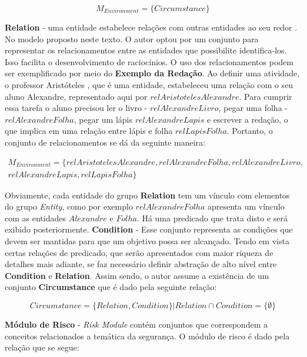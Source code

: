 \begin{equation}
    M_{Environment} = \{  Circumstance  \}
\end{equation}

\textbf{Relation} - uma entidade estabelece relações com outras entidades ao seu redor \cite{entity}. No modelo proposto neste texto. O autor optou por um conjunto para representar os relacionamentos entre as entidades que possibilite identifica-los. Isso facilita o desenvolvimento de raciocínios. O uso 
dos relacionamentos podem ser exemplificado por meio do \textbf{Exemplo da Redação}. Ao definir uma atividade, o professor Aristóteles
, que é uma entidade, estabeleceu uma relação com o seu aluno Alexandre, representado aqui por $relAristotelesAlexandre$. Para cumprir essa tarefa o aluno precisou ler o livro - $relAlexandreLivro$, pegar uma folha - $relAlexandreFolha$,  pegar um lápis $relAlexandreLapis$ e escrever a redação, o que implica em uma relação entre lápis e folha $relLapisFolha$. Portanto, o conjunto de relacionamentos se dá da seguinte maneira:

\begin{eqnarray}\label{Environment}\nonumber
    M_{Environment} = \{ relAristotelesAlexandre, relAlexandreFolha, relAlexandreLivro, \\ \nonumber
     relAlexandreLapis, relLapisFolha \}
\end{eqnarray}

Obviamente, cada entidade do grupo \textbf{Relation} tem um vínculo com elementos do grupo \textit{Entity}, como por exemplo $relAlexandreFolha$ apresenta um vínculo com as entidades $Alexandre$ e $Folha$. Há uma predicado que trata disto e será exibido posteriormente. \textbf{Condition} - Esse conjunto representa as condições que devem ser mantidas para que um objetivo possa ser alcançado. Tendo em vista certas relações de predicado, que serão apresentados com maior riqueza de detalhes mais adiante, se faz necessário definir abstração de alto nível entre \textbf{Condition} e \textbf{Relation}. Assim sendo, o autor assume a existência de um conjunto \textbf{Circumstance} que é dado pela seguinte relação: 

\begin{equation}
    Circumstance = \{ Relation, Condition \} |  Relation \cap Condition = \{ \emptyset \}
\end{equation}


\textbf{Módulo de Risco} - \textit{Risk Module} contém conjuntos que correspondem a conceitos relacionados a temática da segurança.
O módulo de risco é dado pela relação que se segue:

